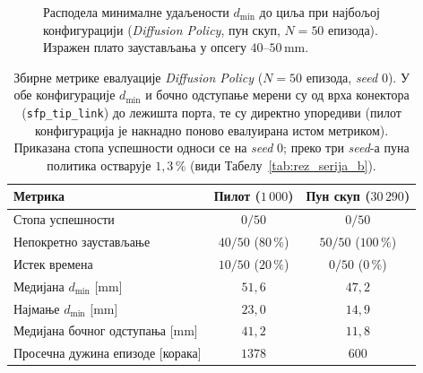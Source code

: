 \documentclass[12pt, a4paper]{article}
\begin{document}
\begin{figure}[htbp]
    \centering
    \caption[Расподела $d_{\min}$ при најбољој конфигурацији]{Расподела минималне удаљености $d_{\min}$ до циља при најбољој конфигурацији (\textit{Diffusion Policy}, пун скуп, $N=50$ епизода). Изражен плато заустављања у опсегу $40$–$50$\,mm.}
    \label{fig:rez_serija_v}
\end{figure}

\begin{table}[htbp]
    \caption[Збирне метрике евалуације \textit{Diffusion Policy}]{Збирне метрике евалуације \textit{Diffusion Policy} ($N=50$ епизода, \textit{seed} $0$). У обе конфигурације $d_{\min}$ и бочно одступање мерени су од врха конектора (\texttt{sfp\_tip\_link}) до лежишта порта, те су директно упоредиви (пилот конфигурација је накнадно поново евалуирана истом метриком). Приказана стопа успешности односи се на \textit{seed} $0$; преко три \textit{seed}-а пуна политика остварује $1{,}3\,\%$ (види Табелу~\ref{tab:rez_serija_b}).}
    \label{tab:rez_serija_v}
    \centering
    \begin{tabular}{l c c}
        \toprule
        Метрика & Пилот ($1\,000$) & Пун скуп ($30\,290$) \\
        \midrule
        Стопа успешности & $0/50$ & $0/50$ \\
        Непокретно заустављање & $40/50$ ($80\,\%$) & $50/50$ ($100\,\%$) \\
        Истек времена & $10/50$ ($20\,\%$) & $0/50$ ($0\,\%$) \\
        Медијана $d_{\min}$ [mm] & $51{,}6$ & $47{,}2$ \\
        Најмање $d_{\min}$ [mm] & $23{,}0$ & $14{,}9$ \\
        Медијана бочног одступања [mm] & $41{,}2$ & $11{,}8$ \\
        Просечна дужина епизоде [корака] & $1378$ & $600$ \\
        \bottomrule
    \end{tabular}
\end{table}
\end{document}
